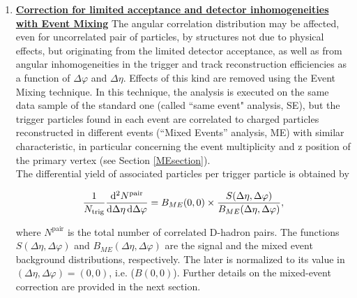\begin{enumerate}
\item
\underline{\bf Correction for limited acceptance and detector inhomogeneities with Event Mixing}
The angular correlation distribution may be affected, even for uncorrelated pair of particles, by structures not due to physical effects, but originating from the limited detector acceptance, as well as from angular inhomogeneities in the trigger and track reconstruction efficiencies as a function of $\Delta\varphi$ and $\Delta\eta$.
Effects of this kind are removed using the Event Mixing technique.
In this technique, the analysis is executed on the same data sample of the standard one (called ``same event" analysis, SE), but the trigger particles found in each event are correlated to charged particles reconstructed in different events (``Mixed Events'' analysis, ME) with similar characteristic, in particular concerning the event multiplicity and z position of the primary vertex (see Section \ref{MEsection}). \\

The differential yield of associated particles per trigger particle is obtained by
\begin{linenomath}
  \begin{equation}
    \label{2pcorr_incl}
    \frac{1}{N_\text{trig}}\frac{\mathrm{d}^{2}N^\text{pair}}{\mathrm{d}\Delta\eta\, \mathrm{d}\Delta\varphi}
= B_{ME}(0,0)\times\frac{S(\Delta\eta,\Delta\varphi)}{B_{ME}(\Delta\eta,\Delta\varphi)},
\end{equation}
\end{linenomath}
where $N^\text{pair}$ is the total number of correlated D-hadron
pairs. The functions $S(\Delta\eta,\Delta\varphi)$ and
$B_{ME}(\Delta\eta,\Delta\varphi)$ are the signal and the mixed event
background distributions, respectively. The later is normalized to its value in
$(\Delta\eta,\Delta\varphi)=(0,0)$, i.e. ($B(0,0)$).
Further details on the mixed-event correction are provided in the next section.


\end{enumerate}

